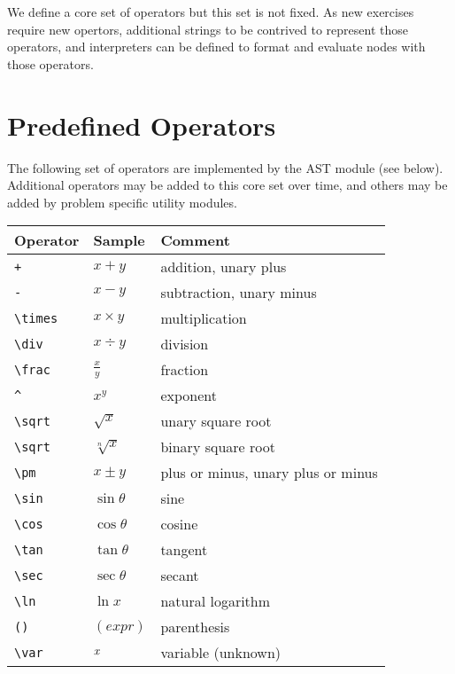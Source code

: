 \documentclass{article}
\newcommand{\var}[1]{\emph{#1}}
\begin{document}
We define a core set of operators but this set is not fixed. As new exercises require new opertors, 
additional strings to be contrived to represent those operators, and interpreters can be defined to
format and evaluate nodes with those operators.

\section{Predefined Operators}

The following set of operators are implemented by the AST module (see below). Additional operators
may be added to this core set over time, and others may be added by problem specific utility 
modules.

    \begin{tabular}{ | l | l | p{10cm} |}
    \hline
    {\bf Operator}& {\bf Sample}   & {\bf Comment} \\ \hline
    \verb'+'      & $x+y$          & addition, unary plus\\ \hline
    \verb'-'      & $x-y$          & subtraction, unary minus\\ \hline
    \verb'\times' & $x \times y$   & multiplication\\ \hline
    \verb'\div'   & $x \div y$     & division\\ \hline
    \verb'\frac'  & $\frac{x}{y}$  & fraction\\ \hline
    \verb'^'      & $x^y$          & exponent\\ \hline
    \verb'\sqrt'  & $\sqrt{x}$     & unary square root\\ \hline
    \verb'\sqrt'  & $\sqrt[n]{x}$  & binary square root\\ \hline
    \verb'\pm'    & $x \pm y$      & plus or minus, unary plus or minus\\ \hline
    \verb'\sin'   & $\sin{\theta}$ & sine\\ \hline
    \verb'\cos'   & $\cos{\theta}$ & cosine\\ \hline
    \verb'\tan'   & $\tan{\theta}$ & tangent\\ \hline
    \verb'\sec'   & $\sec{\theta}$ & secant\\ \hline
    \verb'\ln'    & $\ln{x}$       & natural logarithm\\ \hline
    \verb'()'     & $(expr)$       & parenthesis\\ \hline
    \verb'\var'   & $\var{x}$      & variable (unknown)\\ \hline
    \end{tabular}
\end{document}
